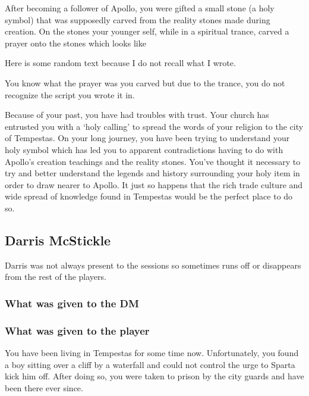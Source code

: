 After becoming a follower of Apollo, you were gifted a small stone (a holy symbol) that was supposedly carved from the reality stones made during creation. On the stones your younger self, while in a spiritual trance, carved a prayer onto the stones which looks like

\begin{center}
	{\Large {} 
	Here is some random text because I do not recall what I wrote.
	}
\end{center}

You know what the prayer was you carved but due to the trance, you do not recognize the script you wrote it in.

Because of your past, you have had troubles with trust. Your church has entrusted you with a `holy calling' to spread the words of your religion to the city of Tempestas. On your long journey, you have been trying to understand your holy symbol which has led you to apparent contradictions having to do with Apollo's creation teachings and the reality stones. You've thought it necessary to try and better understand the legends and history surrounding your holy item in order to draw nearer to Apollo. It just so happens that the rich trade culture and wide spread of knowledge found in Tempestas would be the perfect place to do so.

\subsection{Darris McStickle}

Darris was not always present to the sessions so sometimes runs off or disappears from the rest of the players.

\subsubsection{What was given to the DM}



\subsubsection{What was given to the player}

You have been living in Tempestas for some time now. Unfortunately, you found a boy sitting over a cliff by a waterfall and could not control the urge to Sparta kick him off. After doing so, you were taken to prison by the city guards and have been there ever since.

